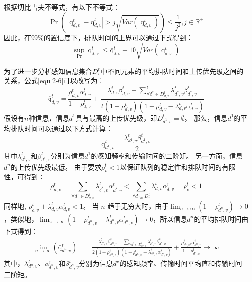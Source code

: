 根据切比雪夫不等式，有以下不等式：
\begin{equation}
	\operatorname{Pr}(|\operatorname{q}_{d, v}^t - \operatorname{\bar{q}}_{d, v}^t| > j \sqrt{{Var}(\operatorname{q}_{d, v}^t)}) \leq \frac{1}{j^2}, j \in \mathbb{R}^{+}
\end{equation}
因此，在99\%的置信度下，排队时间的上界可以通过下式得到：
\begin{equation}
	\sup_{\operatorname{Pr}}{\operatorname{q}_{d, v}^t} \leq \operatorname{\bar{q}}_{d, v}^t + 10  \sqrt{{Var}(\operatorname{q}_{d, v}^t)}
\end{equation}

为了进一步分析感知信息集合$D_v^t$中不同元素的平均排队时间和上传优先级之间的关系，公式\ref{equ 2-6}可以改写为：
\begin{equation}
\overline{\mathrm{q}}_{d, v}^t=\frac{\rho_{d, v}^t \alpha_{d, v}^t}{1-\rho_{d, v}^t}+\frac{\lambda_{d, v}^t \beta_{d, v}^t+\sum_{\forall d^* \in D_{d, v}^t}^t \lambda_{d^*, v}^t \beta_{d^*, v}^t}{2\left(1-\rho_{d, v}^t\right)\left(1-\rho_{d, v}^t-\lambda_{d, v}^t \alpha_{d, v}^t\right)}
\end{equation}
假设有$n$种信息，信息${d^1}$具有最高的上传优先级，即$D_{d^1, v}^t = \emptyset$。
那么，信息${d^1}$的平均排队时间可以通过以下方式计算：
\begin{equation}
\operatorname{\bar{q}}_{d^{1}, v}^t=\frac{\lambda_{d^1, v}^t \beta_{d^1, v}^t}{2}
\end{equation}
其中$\lambda_{d^1, v}^t$和$\beta_{d^1, v}^t$分别为信息$d^1$的感知频率和传输时间的二阶矩。
另一方面，信息${d^n}$的上传优先级最低。
由于要求$\rho_v^t < 1$以保证队列的稳定性和排队时间的有限性，可得到：
\begin{equation}
\rho_{d, v}^t=\sum_{\forall d^* \in D_{d, v}^t} \lambda_{d^*, v}^t \alpha_{d^*, v}^t<\sum_{\forall d \subseteq D_v^t} \lambda_{d, v}^t \alpha_{d, v}^t=\rho_v^t<1
\end{equation}
同样地, $\rho_{d, v}^t+\lambda_{d, v}^t \alpha_{d, v}^t<1$。
当 $n$ 趋于无穷大时，由于$\lim _{n \rightarrow \infty}(1-\rho_{d^n, v}^t) \rightarrow 0$，类似地，$\lim _{n \rightarrow \infty}(1-\rho_{d^n, v}^t-\lambda_{d^n, v}^t \alpha_{d^n, v}^t) \rightarrow 0$，所以信息${d^n}$的平均排队时间由下式得到：
\begin{equation}
\begin{aligned}
	\lim _{n \rightarrow \infty}\left(\mathrm{\bar{q}}_{d^n, v}^t\right)&=\frac{\lambda_{d^n, v}^t \beta_{d^n, v}^t+\sum_{\forall d^* \in D_{d^n, v}^t} \lambda_{d^*, v}^t \beta_{d^*, v}^t}{2\left(1-\rho_{d^n, v}^t\right)\left(1-\rho_{d^n, v}^t-\lambda_{d^n, v}^t \alpha_{d^n, v}^t\right)} + \frac{\rho_{d^n, v^t}^t \alpha_{d^n, v}^t}{1-\rho_{d^n, v}^t}\rightarrow \infty
\end{aligned}
\end{equation}
其中，$\lambda_{d^n, v}^t$、$\alpha_{d^n, v}^t$和$\beta_{d^n, v}^t$分别为信息$d^n$的感知频率、传输时间平均值和传输时间二阶矩。

